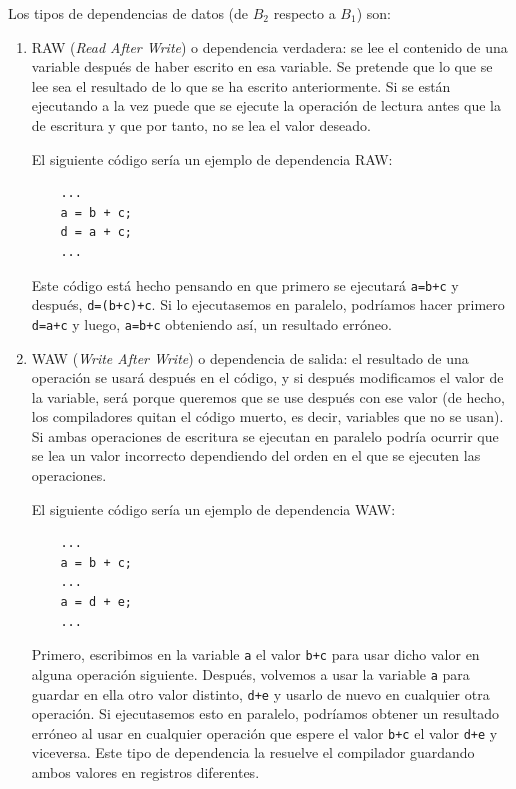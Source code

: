 \documentclass[10pt,a4paper,spanish]{report}
\begin{document}
Los tipos de dependencias de datos (de $B_2$ respecto a $B_1$) son:
\begin{enumerate}[\color{azul}{\bf $\heartsuit$}]
\label{dependencias_de_datos}
    \item RAW (\textit{\textcolor[rgb]{0.2,0.4,0.8}{Read After Write}}) o dependencia verdadera: se lee el contenido de una variable después de haber escrito en esa variable. Se pretende que lo que se lee sea el resultado de lo que se ha escrito anteriormente. Si se están ejecutando a la vez puede que se ejecute la operación de lectura antes que la de escritura y que por tanto, no se lea el valor deseado.

    El siguiente código sería un ejemplo de dependencia RAW:
    \begin{verbatim}
    ...
    a = b + c;
    d = a + c;
    ...
    \end{verbatim}

    Este código está hecho pensando en que primero se ejecutará \verb*|a=b+c| y después, \verb*|d=(b+c)+c|. Si lo ejecutasemos en paralelo, podríamos hacer primero \verb*|d=a+c| y luego, \verb*|a=b+c| obteniendo así, un resultado erróneo. 

    \item WAW (\textit{\textcolor[rgb]{0.2,0.4,0.8}{Write After Write}}) o dependencia de salida: el resultado de una operación se usará después en el código, y si después modificamos el valor de la variable, será porque queremos que se use después con ese valor (de hecho, los compiladores quitan el código muerto, es decir, variables que no se usan). Si ambas operaciones de escritura se ejecutan en paralelo podría ocurrir que se lea un valor incorrecto dependiendo del orden en el que se ejecuten las operaciones.

    El siguiente código sería un ejemplo de dependencia WAW:
    \begin{verbatim}
    ...
    a = b + c;
    ...
    a = d + e;
    ...
    \end{verbatim}

    Primero, escribimos en la variable \verb*|a| el valor \verb*|b+c| para usar dicho valor en alguna operación siguiente. Después, volvemos a usar la variable \verb*|a| para guardar en ella otro valor distinto, \verb*|d+e| y usarlo de nuevo en cualquier otra operación. Si ejecutasemos esto en paralelo, podríamos obtener un resultado erróneo al usar en cualquier operación que espere el valor \verb*|b+c| el valor \verb*|d+e| y viceversa. Este tipo de dependencia la resuelve el compilador guardando ambos valores en registros diferentes.


\end{enumerate}
\end{document}
